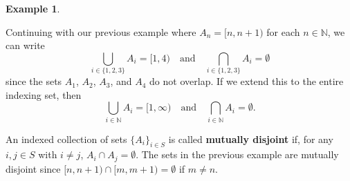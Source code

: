 \documentclass[
]{book}
\theoremstyle{definition}
\theoremstyle{definition}
\newtheorem{example}{Example}[chapter]
\theoremstyle{definition}
\theoremstyle{definition}
\theoremstyle{remark}
\begin{document}
\begin{example}
\protect\hypertarget{exm:disjoint}{}\label{exm:disjoint}

Continuing with our previous example where \(A_n= [n,n+1)\) for each \(n\in \mathbb{N}\), we can write
\[\bigcup_{i\in \{1,2,3\}} A_i = [1,4) \quad \mbox{and} \quad \bigcap_{i\in \{1,2,3\}} A_i = \emptyset\]
since the sets \(A_1\), \(A_2\), \(A_3\), and \(A_4\) do not overlap. If we extend this to the entire indexing set, then \[\bigcup_{i\in \mathbb{N}} A_i = [1,\infty) \quad \mbox{and} \quad \bigcap_{i\in \mathbb{N}} A_i = \emptyset.\]

\end{example}

An indexed collection of sets \(\{A_i\}_{i\in S}\) is called \textbf{mutually disjoint} if, for any \(i,j\in S\) with \(i\neq j\), \(A_i \cap A_j = \emptyset\). The sets in the previous example are mutually disjoint since \([n,n+1) \cap [m,m+1) = \emptyset\) if \(m\neq n\).
\end{document}
